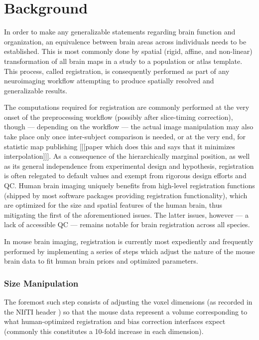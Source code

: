 \section{Background}

In order to make any generalizable statements regarding brain function and organization, an equivalence between brain areas across individuals needs to be established.
This is most commonly done by spatial (rigid, affine, and non-linear) transformation of all brain maps in a study to a population or atlas template.
This process, called registration, is consequently performed as part of any neuroimaging workflow attempting to produce spatially resolved and generalizable results.

The computations required for registration are commonly performed at the very onset of the preprocessing workflow (possibly after slice-timing correction),
though --- depending on the workflow --- the actual image manipulation may also take place only once inter-subject comparison is needed, or at the very end, for statistic map publishing [[[paper which does this and says that it minimizes interpolation]]].
As a consequence of the hierarchically marginal position, as well as its general independence from experimental design and hypothesis, registration is often relegated to default values and exempt from rigorous design efforts and QC.
Human brain imaging uniquely benefits from high-level registration functions (shipped by most software packages providing registration functionality), which are optimized for the size and spatial features of the human brain, thus mitigating the first of the aforementioned issues.
The latter issues, however --- a lack of accessible QC --- remains notable for brain registration across all species.

In mouse brain imaging, registration is currently most expediently and frequently performed by implementing a series of steps which adjust the nature of the mouse brain data to fit human brain priors and optimized parameters.

\subsubsection{Size Manipulation}
The foremost such step consists of adjusting the voxel dimensions (as recorded in the NIfTI header \cite{nifti}) so that the mouse data represent a volume corresponding to what human-optimized registration and bias correction interfaces expect (commonly this constitutes a 10-fold increase in each dimension).	

